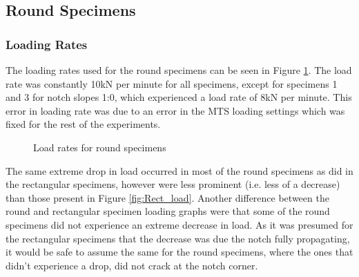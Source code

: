 \documentclass[11pt,a4paper]{article}
\numberwithin{equation}{subsection}
\begin{document}
\subsection{Round Specimens}
\subsubsection{Loading Rates}
The loading rates used for the round specimens can be seen in Figure \ref{fig:Round_load}. The load rate was constantly 10kN per minute for all specimens, except for specimens 1 and 3 for notch slopes 1:0, which experienced a load rate of 8kN per minute. This error in loading rate was due to an error in the MTS loading settings which was fixed for the rest of the experiments.

\vspace*{\baselineskip}

\begin{figure}[h]
	\begin{center}
	\end{center}
	\caption{Load rates for round specimens}
	\label{fig:Round_load}
\end{figure}

\noindent
The same extreme drop in load occurred in most of the round specimens as did in the rectangular specimens, however were less prominent (i.e. less of a decrease) than those present in Figure \ref{fig:Rect_load}. Another difference between the round and rectangular specimen loading graphs were that some of the round specimens did not experience an extreme decrease in load. As it was presumed for the rectangular specimens that the decrease was due the notch fully propagating, it would be safe to assume the same for the round specimens, where the ones that didn't experience a drop, did not crack at the notch corner. 
\end{document}
